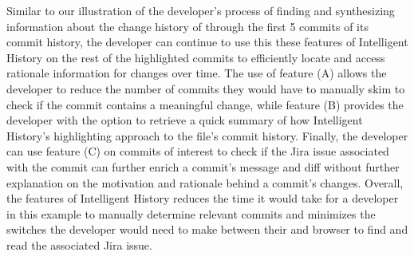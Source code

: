 Similar to our illustration of the developer's process of finding and synthesizing information about the change history of  through the first 5 commits of its commit history, the developer can continue to use this these features of Intelligent History on the rest of the highlighted commits to efficiently locate and access rationale information for changes over time.
The use of feature (A) allows the developer to reduce the number of commits they would have to manually skim to check if the commit contains a meaningful change, while feature (B) provides the developer with the option to retrieve a quick summary of how Intelligent History's highlighting approach to the file's commit history.
Finally, the developer can use feature (C) on commits of interest to check if the Jira issue associated with the commit can further enrich a commit's message and diff without further explanation on the motivation and rationale behind a commit's changes.
Overall, the features of Intelligent History reduces the time it would take for a developer in this example to manually determine relevant commits and minimizes the switches the developer would need to make between their  and browser to find and read the associated Jira issue.

\endinput

Any text after an \endinput is ignored.
You could put scraps here or things in progress.